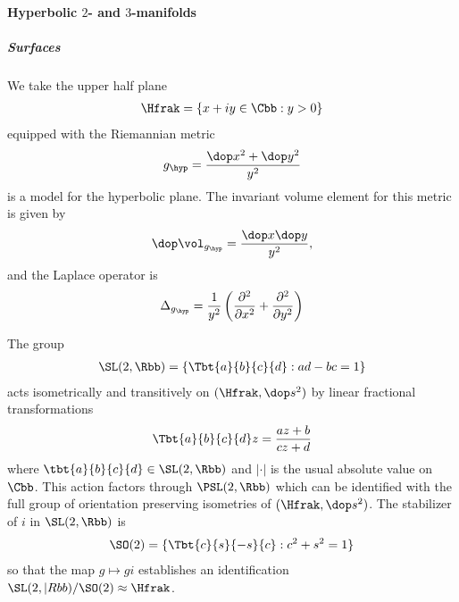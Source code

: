     \paragraph{Hyperbolic $2$- and $3$-manifolds}

    \subparagraph{Surfaces}
    We take the upper half plane
    \begin{align*}
        \Hfrak = \{ x+iy \in \Cbb : y >0\}
    \end{align*}
    equipped with the Riemannian metric
    \begin{align*}
        g_\hyp = \frac{\dop x^2 +\dop y^2}{y^2}
    \end{align*}
    is a model for the hyperbolic plane. The invariant volume element for this metric is given by
    \begin{align*}
        \dop \vol_{g_\hyp} = \frac{\dop x \dop y}{y^2},
    \end{align*}
    and the Laplace operator is
    \begin{align*}
        \Delta_{g_\hyp} = \frac{1}{y^2}\left( \frac{\partial^2 }{\partial x^2}+ \frac{\partial^2 }{\partial y^2} \right)
    \end{align*}

    The group
    \begin{align*}
        \SL(2,\Rbb) = \left\{ \Tbt{a}{b}{c}{d}: ad-bc =1 \right\}
    \end{align*}
    acts isometrically and transitively on $(\Hfrak,\dop s^2)$ by linear fractional transformations
    \begin{align*}
        \Tbt{a}{b}{c}{d} z = \frac{az+b}{cz+d} %
    \end{align*}
    where $\tbt{a}{b}{c}{d} \in \SL(2,\Rbb)$ and $|\cdot|$ is the usual absolute value on $\Cbb$. This action factors through $\PSL(2,\Rbb)$ which can be identified with the full group of orientation preserving isometries of $(\Hfrak,\dop s^2)$. The stabilizer of $i$ in $\SL(2,\Rbb)$ is
    \begin{align*}
        \SO(2) = \{\Tbt{c}{s}{-s}{c}: c^2 + s^2 =1\}
    \end{align*}
    so that the map $g \mapsto g i$ establishes an identification $\SL(2,|Rbb) / \SO(2) \approx \Hfrak$.

